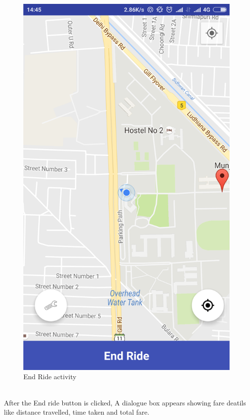 \begin{figure}[h]
	\centering
	\includegraphics[width=0.7\linewidth]{p04}
	\caption{End Ride activity}
\end{figure}
\\
After the End ride button is clicked, A dialogue box appears showing fare deatils like distance travelled, time taken and total fare.
